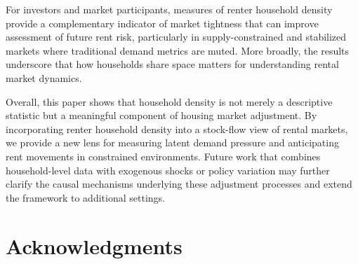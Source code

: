 \documentclass[pdflatex,sn-basic]{sn-jnl}%
\theoremstyle{thmstyleone}%
\theoremstyle{thmstyletwo}%
\theoremstyle{thmstylethree}%
\begin{document}
For investors and market participants, measures of renter household density provide a
complementary indicator of market tightness that can improve assessment of future rent
risk, particularly in supply-constrained and stabilized markets where traditional demand
metrics are muted. More broadly, the results underscore that how households share space
matters for understanding rental market dynamics.

Overall, this paper shows that household density is not merely a descriptive statistic
but a meaningful component of housing market adjustment. By incorporating renter
household density into a stock-flow view of rental markets, we provide a new lens for
measuring latent demand pressure and anticipating rent movements in constrained
environments. Future work that combines household-level data with exogenous shocks
or policy variation may further clarify the causal mechanisms underlying these
adjustment processes and extend the framework to additional settings.


\backmatter
\clearpage
\section*{Acknowledgments}
\end{document}
